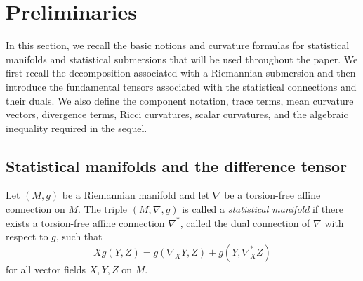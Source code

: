 \documentclass[10pt,a4paper]{article}
\newtheorem{lemma}[theorem]{Lemma}
\theoremstyle{definition}
\theoremstyle{remark}
\numberwithin{equation}{section}
\begin{document}
%
%


\section{Preliminaries}

In this section, we recall the basic notions and curvature formulas for
statistical manifolds and statistical submersions that will be used
throughout the paper. We first recall the decomposition associated with a
Riemannian submersion and then introduce the fundamental tensors associated
with the statistical connections and their duals. We also define the
component notation, trace terms, mean curvature vectors, divergence terms,
Ricci curvatures, scalar curvatures, and the algebraic inequality required
in the sequel.

\subsection{Statistical manifolds and the difference tensor}

Let $(M,g)$ be a Riemannian manifold and let $\nabla$ be a torsion-free
affine connection on $M$. The triple $(M,\nabla,g)$ is called a
\emph{statistical manifold} if there exists a torsion-free affine
connection $\nabla^{*}$, called the dual connection of $\nabla$ with
respect to $g$, such that
\begin{equation}
Xg(Y,Z)
=
g(\nabla_XY,Z)+g(Y,\nabla^{*}_{X}Z)
\label{eq-statistical-manifold}
\end{equation}
for all vector fields $X,Y,Z$ on $M$.
\end{document}
